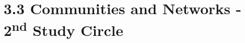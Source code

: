 \section*{3.3 Communities and Networks - 2\textsuperscript{nd} Study Circle}

\cite{hytonen2014does}